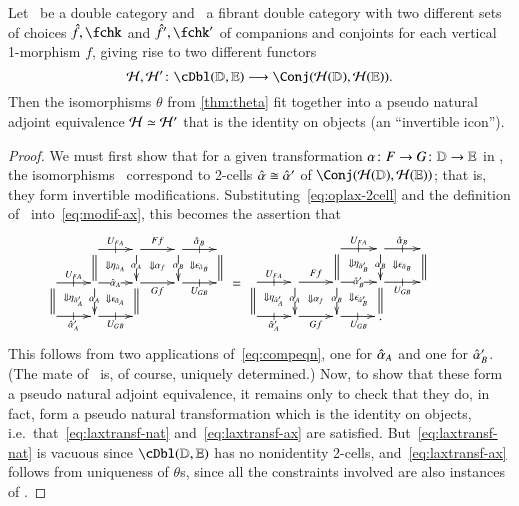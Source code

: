 \begin{lem}\label{thm:h-locfr-uniq}
  Let \lD\ be a double category and \lE\ a fibrant double category
  with two different sets of choices $\fhat,\fchk$ and $\fhat',\fchk'$
  of companions and conjoints for each vertical 1-morphism $f$, giving
  rise to two different functors
  \[\cH,\cH'\maps \cDbl(\lD,\lE)\too \Conj(\cH(\lD),\cH(\lE)).\]
  Then the isomorphisms $\theta$ from \autoref{thm:theta} fit together
  into a pseudo natural adjoint equivalence $\mathcal{H}\simeq \mathcal{H}'$ that is the
  identity on objects (an ``invertible icon'').
\end{lem}
\begin{proof}
  We must first show that for a given transformation $\alpha\colon F\to
  G\colon \mathbb{D}\to\mathbb{E}$ in \cDbl, the isomorphisms \th\ correspond to 2-cells $\hat{\alpha} \cong \hat{\alpha}'$ of $\Conj(\cH(\lD),\cH(\lE))$; that is, they form invertible
  modifications.
  Substituting~\eqref{eq:oplax-2cell} and the definition of \th\
  into~\eqref{eq:modif-ax}, this becomes the assertion that
  \begin{equation}
    \vcenter{\xymatrix@R=1.5pc@C=2pc{
        &
        \ar[r]|-@{|}^{U_{FA}}\ar@{=}[d] \ar@{}[dr]|{\Downarrow \eta_{\hat{\alpha}_A}} &
        \ar[r]^{Ff}\ar[d]|{\al_A} \ar@{}[dr]|{\Downarrow \al_f} &
        \ar[r]|-@{|}^{\alhat_B}\ar[d]|{\al_B} \ar@{}[dr]|{\Downarrow \epsilon_{\hat{\alpha}_B}} &
        \ar@{=}[d]\\
        \ar[r]|-@{|}^{U_{FA}} \ar@{=}[d] \ar@{}[dr]|{\Downarrow \eta_{\hat{\alpha}_A'}} &
        \ar[r]|{\alhat_A} \ar[d]|{\al_A} \ar@{}[dr]|{\Downarrow \epsilon_{\hat{\alpha}_A}}&
        \ar[r]_{Gf}  \ar@{=}[d] &
        \ar[r]|-@{|}_{U_{GB}} & \\
        \ar[r]|-@{|}_{\alhat_A'} & \ar[r]|-@{|}_{U_{GB}}&&
      }} \;=\;
    \vcenter{\xymatrix@R=1.5pc@C=2pc{
        && \ar@{=}[d] \ar[r]|-@{|}^{U_{FA}} \ar@{}[dr]|{\Downarrow \eta_{\hat{\alpha}_B'}} &
        \ar[d]|{\al_B} \ar[r]|-@{|}^{\alhat_B} \ar@{}[dr]|{\Downarrow \epsilon_{\hat{\alpha}_B}}
        &
        \ar@{=}[d] &\\
        \ar[r]|-@{|}^{U_{FA}}\ar@{=}[d] \ar@{}[dr]|{\Downarrow \eta_{\hat{\alpha}_A'}} &
        \ar[r]^{Ff}\ar[d]|{\al_A} \ar@{}[dr]|{\Downarrow \al_f} &
        \ar[r]|{\alhat_B'}\ar[d]|{\al_B} \ar@{}[dr]|{\Downarrow \epsilon_{\hat{\alpha}_B'}} &
        \ar@{=}[d] \ar[r]|-@{|}_{U_{GB}}&\\
        \ar[r]|-@{|}_{\alhat_A'} &
        \ar[r]_{Gf} &
        \ar[r]|-@{|}_{U_{GB}} & .
      }}
  \end{equation}
  This follows from two applications of~\eqref{eq:compeqn}, one for
  $\hat{\alpha}_A$ and one for $\hat{\alpha}_B'$.  (The mate of \th\ is, of
  course, uniquely determined.)  Now, to show that these form a pseudo
  natural adjoint equivalence, it remains only to check that they do,
  in fact, form a pseudo natural transformation which is the identity
  on objects, i.e.\ that~\eqref{eq:laxtransf-nat}
  and~\eqref{eq:laxtransf-ax} are satisfied.
  But~\eqref{eq:laxtransf-nat} is vacuous since $\cDbl(\lD,\lE)$ has
  no nonidentity 2-cells, and~\eqref{eq:laxtransf-ax} follows from uniqueness of $\theta$s,
  since all the constraints involved are also instances of \th.
\end{proof}
